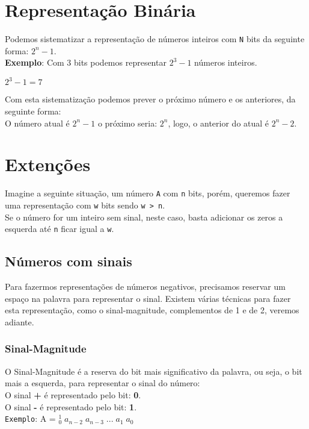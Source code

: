 \documentclass[12pt, onecolumn]{article}
\begin{document}
		\section{Representação Binária}
	
	Podemos sistematizar a representação de números inteiros com \texttt{N} bits
	da seguinte forma: $2^{n} - 1$. \\
	\newline
	\textbf{Exemplo}: Com 3 bits podemos representar $2^{3} - 1$ números inteiros.
			\begin{center} 
				$2^{3} - 1 = 7$ \\
			\end{center}
	Com esta sistematização podemos prever o próximo número e os anteriores, 
	da seguinte forma: \\
	\newline
	O número atual é $2^{n} - 1$ o próximo seria: $2^{n}$, logo, o anterior
	do atual é $2^{n} - 2$.

		\section{\centering Extenções}
	
	Imagine a seguinte situação, um número \texttt{A} com \texttt{n} bits, porém,
	queremos fazer uma representação com \texttt{w} bits sendo \texttt{w > n}.\\
	\newline
	Se o número for um inteiro sem sinal, neste caso, basta adicionar os zeros
	a esquerda até \texttt{n} ficar igual a \texttt{w}.
	
		\subsection{\centering Números com sinais}
	
	Para fazermos representações de números negativos, precisamos reservar um espaço
	na palavra para representar o sinal. Existem várias técnicas para fazer esta 
	representação, como o sinal-magnitude, complementos de 1 e de 2, veremos
	adiante.

		\subsubsection{\centering Sinal-Magnitude}
	
	O Sinal-Magnitude é a reserva do bit mais significativo da palavra, ou seja, 
	o bit mais a esquerda, para representar o sinal do número: \\
	\newline
	O sinal \textbf{+} é representado pelo bit: \textbf{0}. \\
	O sinal \textbf{-} é representado pelo bit: \textbf{1}. \\
	\newline
	\texttt{Exemplo}: A = ${_0^1}\;a_{n-2}\;a_{n-3}\;...\;a_1\;a_0$
	
\end{document}
